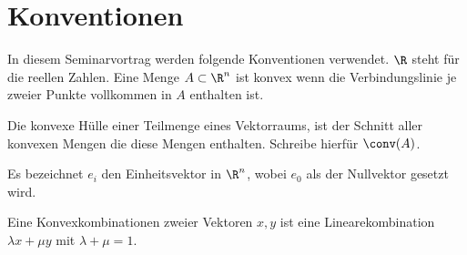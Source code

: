 
\section*{Konventionen}

In diesem Seminarvortrag werden folgende Konventionen verwendet.
$\R$ steht für die reellen Zahlen. Eine Menge $A \subset \R^n$ ist konvex
wenn die Verbindungslinie je zweier Punkte vollkommen in $A$ enthalten ist.

Die konvexe Hülle einer Teilmenge eines Vektorraums, ist der Schnitt
aller konvexen Mengen die diese Mengen enthalten. Schreibe hierfür $\conv(A)$.

Es bezeichnet $e_i$ den Einheitsvektor in $\R^n$, wobei $e_0$ als der Nullvektor gesetzt wird.

Eine Konvexkombinationen zweier Vektoren $x,y$ ist eine Linearekombination $\lambda x + \mu y$ mit $\lambda + \mu = 1$.






